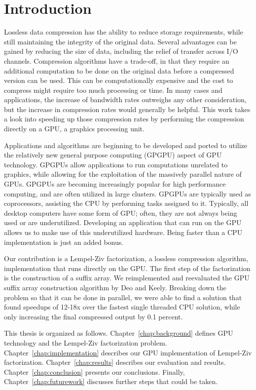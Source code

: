 \chapter{Introduction}
Lossless data compression has the ability to reduce storage requirements, while still maintaining the integrity of the original data.
Several advantages can be gained by reducing the size of data, including the relief of transfer across I/O channels.
Compression algorithms have a trade-off, in that they require an additional computation to be done on the original data before a compressed version can be used.
This can be computationally expensive and the cost to compress might require too much processing or time.
In many cases and applications, the increase of bandwidth rates outweighs any other consideration, but the increase in compression rates would generally be helpful.
This work takes a look into speeding up those compression rates by performing the compression directly on a GPU, a graphics processing unit.

Applications and algorithms are beginning to be developed and ported to utilize the relatively new general purpose computing (GPGPU) aspect of GPU technology.
GPGPUs allow applications to run computations unrelated to graphics, while allowing for the exploitation of the massively parallel nature of GPUs.
GPGPUs are becoming increasingly popular for high performance computing, and are often utilized in large clusters.
GPGPUs are typically used as coprocessors, assisting the CPU by performing tasks assigned to it.
Typically, all desktop computers have some form of GPU; often, they are not always being used or are underutilized.
Developing an application that can run on the GPU allows us to make use of this underutilized hardware.
Being faster than a CPU implementation is just an added bonus.


Our contribution is a Lempel-Ziv factorization, a lossless compression algorithm, implementation that runs directly on the GPU.
The first step of the factorization is the construction of a suffix array.
We reimplemented and reevaluated the GPU suffix array construction algorithm by Deo and Keely\cite{Deo}.
Breaking down the problem so that it can be done in parallel, we were able to find a solution that found speedups of 12-18x over the fastest single threaded CPU solution, while only increasing the final compressed output by 0.1 percent.

This thesis is organized as follows.
Chapter~\ref{chap:background} defines GPU technology and the Lempel-Ziv factorization problem.
Chapter~\ref{chap:implementation} describes our GPU implementation of Lempel-Ziv factorization.
Chapter~\ref{chap:results} describes our evaluation and results.
Chapter~\ref{chap:conclusion} presents our conclusions.
Finally, Chapter~\ref{chap:futurework} discusses further steps that could be taken.
